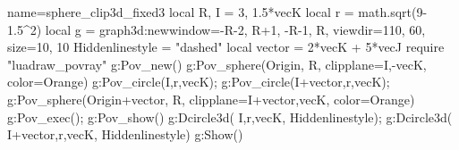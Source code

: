 \documentclass[border=5pt]{standalone}
\begin{document}
\begin{luadraw}{name=sphere_clip3d_fixed3}
local R, I = 3, 1.5*vecK
local r = math.sqrt(9-1.5^2)
local g = graph3d:new{window={-R-2, R+1, -R-1, R}, viewdir={110, 60}, size={10, 10}}
Hiddenlinestyle = "dashed"
local vector = 2*vecK + 5*vecJ 
require "luadraw_povray"
g:Pov_new()
g:Pov_sphere(Origin, R, {clipplane={I,-vecK}, color=Orange})
g:Pov_circle(I,r,vecK); g:Pov_circle(I+vector,r,vecK); 
g:Pov_sphere(Origin+vector, R, {clipplane={I+vector,vecK}, color=Orange})
g:Pov_exec(); g:Pov_show()
g:Dcircle3d( I,r,vecK, Hiddenlinestyle); g:Dcircle3d( I+vector,r,vecK, Hiddenlinestyle)
g:Show()
\end{luadraw}
\end{document}
